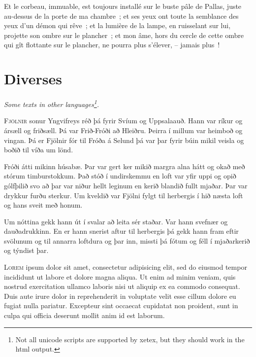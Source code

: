 \documentclass[openany]{book} %
\def\MYxFONT{\rm}   %
\begin{document}
\bigskip
Et le corbeau, immuable, est toujours installé sur le buste pâle de Pallas, juste au-dessus de la porte de ma chambre~; et ses yeux ont toute la semblance des yeux d’un démon qui rêve~; et la lumière de la lampe, en ruisselant sur lui, projette son ombre sur le plancher~; et mon âme, hors du cercle de cette ombre qui gît flottante sur le plancher, ne pourra plus s’élever, – jamais plus~!
\parag 

\hypertarget{toc16}{}
\pagebreak[\PAGExBREAKxPOLICY]
\part{Diverses}

\textit{Some texts in other languages\footnote{\MYxFONT Not all unicode scripts are supported by xetex, but they should work in the html output.}.}



\lettrine[lines=\INITIALxLETTERxSIZE, lhang=0.33, loversize=0.25]{F}{jölnir} sonur Yngvifreys réð þá fyrir Svíum og Uppsalaauð. Hann var ríkur og ársæll og friðsæll. Þá var Frið-Fróði að Hleiðru. Þeirra í millum var heimboð og vingan. Þá er Fjölnir fór til Fróða á Selund þá var þar fyrir búin mikil veisla og boðið til víða um lönd. 

\bigskip

\begin{multicols}{2}

Fróði átti mikinn húsabæ. Þar var gert ker mikið margra alna hátt og okað með stórum timburstokkum. Það stóð í undirskemmu en loft var yfir uppi og opið gólfþilið svo að þar var niður hellt leginum en kerið blandið fullt mjaðar. Þar var drykkur furðu sterkur. 
Um kveldið var Fjölni fylgt til herbergis í hið næsta loft og hans sveit með honum. 

\end{multicols}

\bigskip

Um nóttina gekk hann út í svalar að leita sér staðar. Var hann svefnær og dauðadrukkinn. En er hann snerist aftur til herbergis þá gekk hann fram eftir svölunum og til annarra loftdura og þar inn, missti þá fótum og féll í mjaðarkerið og týndist þar.  
\par\noindent \aldineb 



\lettrine[lines=\INITIALxLETTERxSIZE, lhang=0.33, loversize=0.25]{L}{orem} ipsum dolor sit amet, consectetur adipisicing elit, sed do eiusmod tempor incididunt ut labore et dolore magna aliqua. Ut enim ad minim veniam, quis nostrud exercitation ullamco laboris nisi ut aliquip ex ea commodo consequat. Duis aute irure dolor in reprehenderit in voluptate velit esse cillum dolore eu fugiat nulla pariatur. Excepteur sint occaecat cupidatat non proident, sunt in culpa qui officia deserunt mollit anim id est laborum.
\end{document}
